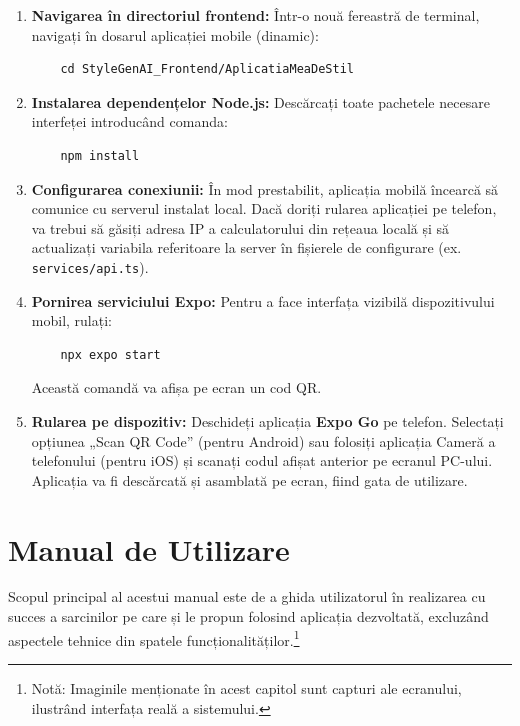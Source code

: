 \begin{enumerate}
    \item \textbf{Navigarea în directoriul frontend:} Într-o nouă fereastră de terminal, navigați în dosarul aplicației mobile (dinamic):
    \begin{verbatim}
    cd StyleGenAI_Frontend/AplicatiaMeaDeStil
    \end{verbatim}
    
    \item \textbf{Instalarea dependențelor Node.js:} Descărcați toate pachetele necesare interfeței introducând comanda:
    \begin{verbatim}
    npm install
    \end{verbatim}
    
    \item \textbf{Configurarea conexiunii:} În mod prestabilit, aplicația mobilă încearcă să comunice cu serverul instalat local. Dacă doriți rularea aplicației pe telefon, va trebui să găsiți adresa IP a calculatorului din rețeaua locală și să actualizați variabila referitoare la server în fișierele de configurare (ex. \texttt{services/api.ts}).
    
    \item \textbf{Pornirea serviciului Expo:} Pentru a face interfața vizibilă dispozitivului mobil, rulați:
    \begin{verbatim}
    npx expo start
    \end{verbatim}
    Această comandă va afișa pe ecran un cod QR.
    
    \item \textbf{Rularea pe dispozitiv:} Deschideți aplicația \textbf{Expo Go} pe telefon. Selectați opțiunea „Scan QR Code” (pentru Android) sau folosiți aplicația Cameră a telefonului (pentru iOS) și scanați codul afișat anterior pe ecranul PC-ului. Aplicația va fi descărcată și asamblată pe ecran, fiind gata de utilizare.
\end{enumerate}

\section{Manual de Utilizare}

Scopul principal al acestui manual este de a ghida utilizatorul în realizarea cu succes a sarcinilor pe care și le propun folosind aplicația dezvoltată, excluzând aspectele tehnice din spatele funcționalităților.\footnote{Notă: Imaginile menționate în acest capitol sunt capturi ale ecranului, ilustrând interfața reală a sistemului.}

